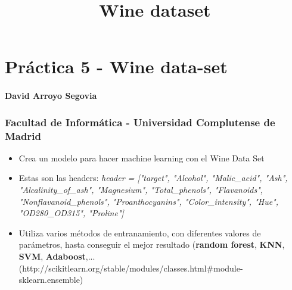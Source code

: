 \documentclass[11pt]{article}
\title{Wine dataset}
\begin{document}
    
    
    \maketitle
    
    

    
    \section{Práctica 5 - Wine
data-set}\label{pruxe1ctica-5---wine-data-set}

\paragraph{David Arroyo Segovia}\label{david-arroyo-segovia}

\subsubsection{Facultad de Informática - Universidad Complutense de
Madrid}\label{facultad-de-informuxe1tica---universidad-complutense-de-madrid}

\begin{itemize}
\item
  Crea un modelo para hacer machine learning con el Wine Data Set
\item
  Estas son las headers: \emph{header = {[}"target", "Alcohol",
  "Malic\_acid", "Ash", "Alcalinity\_of\_ash", "Magnesium",
  "Total\_phenols", "Flavanoids", "Nonflavanoid\_phenols",
  "Proanthocyanins", "Color\_intensity", "Hue", "OD280\_OD315",
  "Proline"{]}}
\item
  Utiliza varios métodos de entranamiento, con diferentes valores de
  parámetros, hasta conseguir el mejor resultado (\textbf{random
  forest}, \textbf{KNN}, \textbf{SVM}, \textbf{Adaboost},...
  (http://scikitlearn.org/stable/modules/classes.html\#module-sklearn.ensemble)
\end{itemize}
\end{document}

